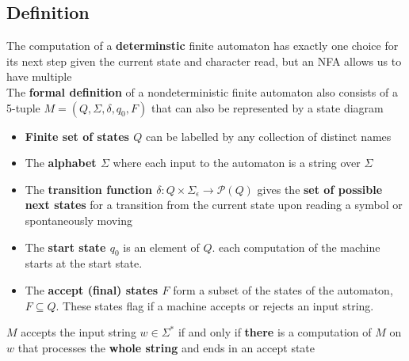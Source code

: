 \documentclass{article}
\begin{document}
\subsection{Definition}
The computation of a \textbf{determinstic} finite automaton has exactly one choice for its next step given the current state and character read, but an NFA allows us to have multiple\\
\newline
The \textbf{formal definition} of a nondeterministic finite automaton also consists of a 5-tuple $M=(Q,\Sigma,\delta,q_0,F)$ that can also be represented by a state diagram
\begin{itemize}
    \item \textbf{Finite set of states $Q$} can be labelled by any collection of distinct names
    \item The \textbf{alphabet $\Sigma$} where each input to the automaton is a string over $\Sigma$
    \item The \textbf{transition function $\delta:Q\times \Sigma_\epsilon\rightarrow\mathcal{P}(Q)$} gives the \textbf{set of possible next states} for a transition from the current state upon reading a symbol or spontaneously moving
    \item The \textbf{start state $q_0$} is an element of $Q$. each computation of the machine starts at the start state.
    \item The \textbf{accept (final) states $F$} form a subset of the states of the automaton, $F\subseteq Q$. These states flag if a machine accepts or rejects an input string.
\end{itemize}
$M$ accepts the input string $w\in\Sigma^*$ if and only if \textbf{there} is a computation of $M$ on $w$ that processes the \textbf{whole string} and ends in an accept state
\end{document}
